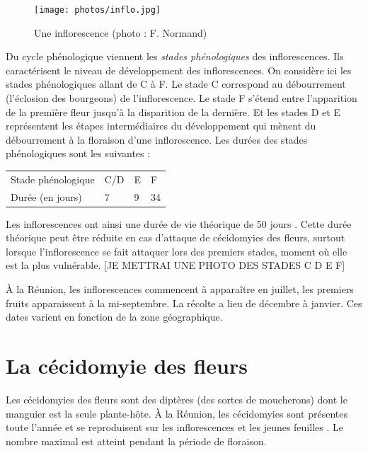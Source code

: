 \begin{figure}[ht]
 \centering
 \texttt{[image: photos/inflo.jpg]}
 \caption{Une inflorescence (photo : F. Normand)}
 \label{fig:inflo}
\end{figure}




Du cycle phénologique viennent les \emph{stades phénologiques} des inflorescences.
Ils caractérisent le niveau de développement des inflorescences.
On considère ici les stades phénologiques allant de C à F.
Le stade C correspond au débourrement (l'éclosion des bourgeons) de l'inflorescence.
Le stade F s'étend entre l'apparition de la première fleur jusqu'à la disparition de la dernière.
Et les stades D et E représentent les étapes intermédiaires du développement qui mènent du débourrement à la floraison d'une inflorescence.
Les durées des stades phénologiques sont les suivantes :
\begin{center}
\begin{tabular}{llll}
Stade phénologique & C/D & E & F\\
Durée (en jours) & 7 & 9 & 34
\end{tabular}
\end{center}
Les inflorescences ont ainsi une durée de vie théorique de 50 jours \citep{laurie}.
Cette durée théorique peut être réduite en cas d'attaque de cécidomyies des fleurs, surtout lorsque l'inflorescence se fait attaquer lors des premiers stades, moment où elle est la plus vulnérable.
[JE METTRAI UNE PHOTO DES STADES C D E F]

À la Réunion, les inflorescences commencent à apparaître en juillet, les premiers fruits apparaissent à la mi-septembre. 
La récolte a lieu de décembre à janvier.
Ces dates varient en fonction de la zone géographique.






\section{La cécidomyie des fleurs}
\label{chap:cecido}

Les cécidomyies des fleurs sont des diptères (des sortes de moucherons) dont le manguier est la seule plante-hôte.
À la Réunion, les cécidomyies sont présentes toute l'année et se reproduisent sur les inflorescences et les jeunes feuilles \citep{paul}.
Le nombre maximal est atteint pendant la période de floraison.

